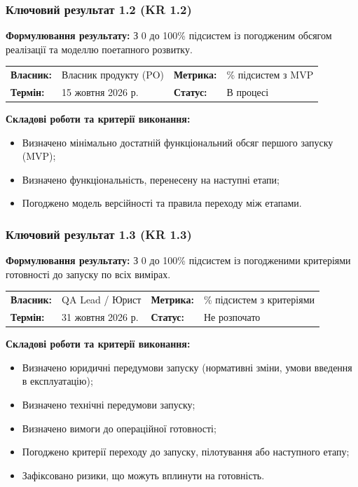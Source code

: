 \documentclass{article}
\begin{document}
\subsubsection{Ключовий результат 1.2 (KR 1.2)}

\textbf{Формулювання результату:} З 0 до 100\% підсистем із погодженим обсягом реалізації та моделлю поетапного розвитку.

\noindent\begin{tabular}{@{}p{2.2cm}p{4.5cm}p{2.2cm}p{4.5cm}@{}}
\toprule
\textbf{Власник:} & Власник продукту (PO) & \textbf{Метрика:} & \% підсистем з MVP \\
\textbf{Термін:} & 15 жовтня 2026 р. & \textbf{Статус:} & В процесі \\
\bottomrule
\end{tabular}

\vspace{10pt}
\textbf{Складові роботи та критерії виконання:}
\begin{itemize}
    \item Визначено мінімально достатній функціональний обсяг першого запуску (MVP);
    \item Визначено функціональність, перенесену на наступні етапи;
    \item Погоджено модель версійності та правила переходу між етапами.
\end{itemize}

\subsubsection{Ключовий результат 1.3 (KR 1.3)}

\textbf{Формулювання результату:} З 0 до 100\% підсистем із погодженими критеріями готовності до запуску по всіх вимірах.

\noindent\begin{tabular}{@{}p{2.2cm}p{4.5cm}p{2.2cm}p{4.5cm}@{}}
\toprule
\textbf{Власник:} & QA Lead / Юрист & \textbf{Метрика:} & \% підсистем з критеріями \\
\textbf{Термін:} & 31 жовтня 2026 р. & \textbf{Статус:} & Не розпочато \\
\bottomrule
\end{tabular}

\vspace{10pt}
\textbf{Складові роботи та критерії виконання:}
\begin{itemize}
    \item Визначено юридичні передумови запуску (нормативні зміни, умови введення в експлуатацію);
    \item Визначено технічні передумови запуску;
    \item Визначено вимоги до операційної готовності;
    \item Погоджено критерії переходу до запуску, пілотування або наступного етапу;
    \item Зафіксовано ризики, що можуть вплинути на готовність.
\end{itemize}
\end{document}
